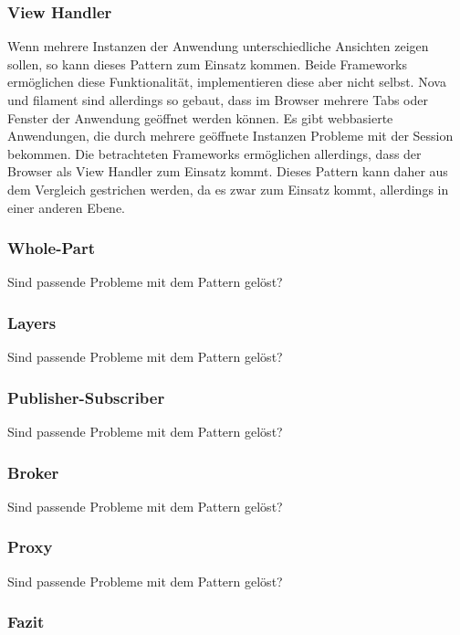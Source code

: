 \subsubsection{View Handler}
Wenn mehrere Instanzen der Anwendung unterschiedliche Ansichten zeigen sollen, so kann dieses Pattern zum Einsatz kommen.
Beide Frameworks ermöglichen diese Funktionalität, implementieren diese aber nicht selbst.
Nova und filament sind allerdings so gebaut, dass im Browser mehrere Tabs oder Fenster der Anwendung geöffnet werden können.
Es gibt webbasierte Anwendungen, die durch mehrere geöffnete Instanzen Probleme mit der Session bekommen.
Die betrachteten Frameworks ermöglichen allerdings, dass der Browser als View Handler zum Einsatz kommt.
Dieses Pattern kann daher aus dem Vergleich gestrichen werden, da es zwar zum Einsatz kommt, allerdings in einer anderen Ebene.

\subsubsection{Whole-Part}
\color{red}
Sind passende Probleme mit dem Pattern gelöst?
\color{black}

\subsubsection{Layers}
\color{red}
Sind passende Probleme mit dem Pattern gelöst?
\color{black}

\subsubsection{Publisher-Subscriber}
\color{red}
Sind passende Probleme mit dem Pattern gelöst?
\cite{filament-docs-events}
\cite{nova-docs-events}
\color{black}

\subsubsection{Broker}
\color{red}
Sind passende Probleme mit dem Pattern gelöst?
\color{black}

\subsubsection{Proxy}
\color{red}
Sind passende Probleme mit dem Pattern gelöst?
\color{black}

\subsubsection{Fazit}

